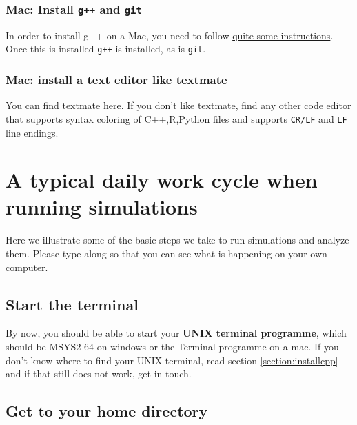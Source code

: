 \documentclass[
]{book}
\begin{document}
\hypertarget{mac-install-g-and-git}{%
\subsection{\texorpdfstring{Mac: Install \texttt{g++} and \texttt{git}}{Mac: Install g++ and git}}\label{mac-install-g-and-git}}

In order to install g++ on a Mac, you need to follow \href{https://www.freecodecamp.org/news/install-xcode-command-line-tools/}{quite some instructions}. Once this is installed \texttt{g++} is installed, as is \texttt{git}.

\hypertarget{mac-install-a-text-editor-like-textmate}{%
\subsection{Mac: install a text editor like textmate}\label{mac-install-a-text-editor-like-textmate}}

You can find textmate \href{https://macromates.com/}{here}. If you don't like textmate, find any other code editor that supports syntax coloring of C++,R,Python files and supports \texttt{CR/LF} and \texttt{LF} line endings.

\hypertarget{a-typical-daily-work-cycle-when-running-simulations}{%
\chapter{A typical daily work cycle when running simulations}\label{a-typical-daily-work-cycle-when-running-simulations}}

Here we illustrate some of the basic steps we take to run simulations and analyze them. Please type along so that you can see what is happening on your own computer.

\hypertarget{start-the-terminal}{%
\section{Start the terminal}\label{start-the-terminal}}

By now, you should be able to start your \textbf{UNIX terminal programme}, which should be MSYS2-64 on windows or the Terminal programme on a mac. If you don't know where to find your UNIX terminal, read section \ref{section:installcpp} and if that still does not work, get in touch.

\hypertarget{section:homedir}{%
\section{Get to your home directory}\label{section:homedir}}
\end{document}
